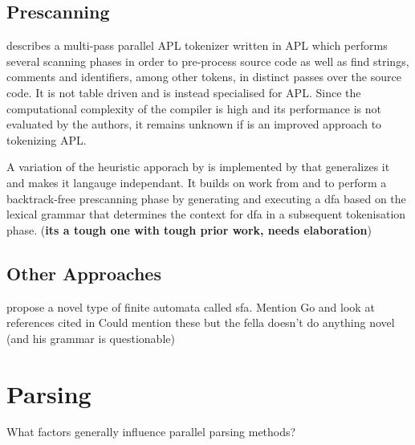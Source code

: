 \subsection{Prescanning} \label{lit_prescanning}

\cite{bernecky_spmdsimd_2003} describes a multi-pass parallel APL tokenizer
written in APL which performs several scanning phases in order to pre-process
source code as well as find strings, comments and identifiers, among other
tokens, in distinct passes over the source code. It is not table driven and is
instead specialised for APL. Since the computational complexity of the compiler
is high and its performance is not evaluated by the authors, it remains unknown
if is an improved approach to tokenizing APL.

A variation of the heuristic apporach by \cite{barenghi_parallel_2015} is
implemented by \cite{li_plex_2021} that generalizes it and makes it langauge
independant. It builds on work from \cite{sinya_simultaneous_2013} and
\cite{zhao_--fly_2015} to perform a backtrack-free prescanning phase by
generating and executing a \gls{dfa} based on the lexical grammar that determines
the context for \gls{dfa} in a subsequent tokenisation phase. (\textbf{its a
tough one with tough prior work, needs elaboration})


\subsection{Other Approaches}

\begin{roughwork}
\cite{sinya_simultaneous_2013} propose a novel type of finite automata called
\gls{sfa}.
\newline \newline
Mention \cite{lin_accelerating_2013, wang_hyperscan_2019,
li_plex_2021, asthagiri_associative_1992} Go and look at references cited in
\cite{zhao_--fly_2015}
\newline \newline
Could mention these but the fella doesn't do anything novel (and his
grammar is questionable) \cite{barve_parallel_2014, barve_parallel_2012,
barve_improved_2015}
\end{roughwork}

\section{Parsing} \label{lit_review_parsing}
\begin{sectionplan}
    What factors generally influence parallel parsing methods?
\end{sectionplan}

